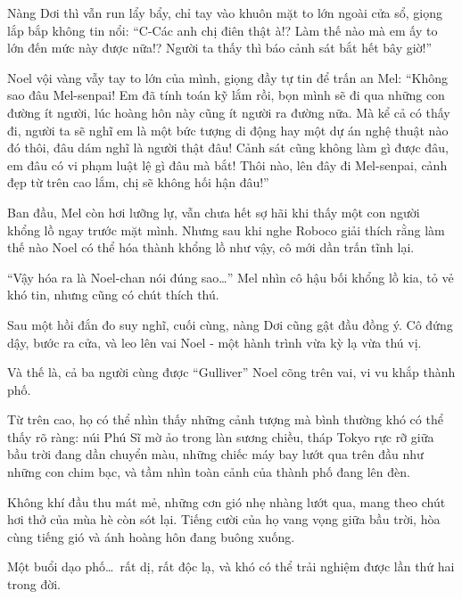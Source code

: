 \documentclass[../main.tex]{subfiles}
\begin{document}
Nàng Dơi thì vẫn run lẩy bẩy, chỉ tay vào khuôn mặt to lớn ngoài cửa sổ, giọng lắp bắp không tin nổi: ``C-Các anh chị điên thật à!? Làm thế nào mà em ấy to lớn đến mức này được nữa!? Người ta thấy thì báo cảnh sát bắt hết bây giờ!''

Noel vội vàng vẫy tay to lớn của mình, giọng đầy tự tin để trấn an Mel: ``Không sao đâu Mel-senpai! Em đã tính toán kỹ lắm rồi, bọn mình sẽ đi qua những con đường ít người, lúc hoàng hôn này cũng ít người ra đường nữa. Mà kể cả có thấy đi, người ta sẽ nghĩ em là một bức tượng di động hay một dự án nghệ thuật nào đó thôi, đâu dám nghĩ là người thật đâu! Cảnh sát cũng không làm gì được đâu, em đâu có vi phạm luật lệ gì đâu mà bắt! Thôi nào, lên đây đi Mel-senpai, cảnh đẹp từ trên cao lắm, chị sẽ không hối hận đâu!''

Ban đầu, Mel còn hơi lưỡng lự, vẫn chưa hết sợ hãi khi thấy một con người khổng lồ ngay trước mặt mình. Nhưng sau khi nghe Roboco giải thích rằng làm thế nào Noel có thể hóa thành khổng lồ như vậy, cô mới dần trấn tĩnh lại.

``Vậy hóa ra là Noel-chan nói đúng sao\dots'' Mel nhìn cô hậu bối khổng lồ kia, tỏ vẻ khó tin, nhưng cũng có chút thích thú.

Sau một hồi đắn đo suy nghĩ, cuối cùng, nàng Dơi cũng gật đầu đồng ý. Cô đứng dậy, bước ra cửa, và leo lên vai Noel - một hành trình vừa kỳ lạ vừa thú vị.

Và thế là, cả ba người cùng được ``Gulliver'' Noel cõng trên vai, vi vu khắp thành phố.


Từ trên cao, họ có thể nhìn thấy những cảnh tượng mà bình thường khó có thể thấy rõ ràng: núi Phú Sĩ mờ ảo trong làn sương chiều, tháp Tokyo rực rỡ giữa bầu trời đang dần chuyển màu, những chiếc máy bay lướt qua trên đầu như những con chim bạc, và tầm nhìn toàn cảnh của thành phố đang lên đèn.

Không khí đầu thu mát mẻ, những cơn gió nhẹ nhàng lướt qua, mang theo chút hơi thở của mùa hè còn sót lại. Tiếng cười của họ vang vọng giữa bầu trời, hòa cùng tiếng gió và ánh hoàng hôn đang buông xuống.

Một buổi dạo phố\dots\ rất dị, rất độc lạ, và khó có thể trải nghiệm được lần thứ hai trong đời.
\end{document}
